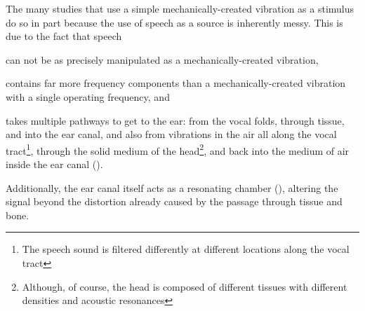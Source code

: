 The many studies that use a simple mechanically-created vibration as a stimulus do so in part because the use of speech as a source is inherently messy.  This is due to the fact that speech 
\begin{enumerate*}[label={\alph*)}]
  \item  can not be as precisely manipulated as a mechanically-created vibration,
  \item  contains far more frequency components than a mechanically-created vibration with a single operating frequency, and 
  \item  takes multiple pathways to get to the ear: from the vocal folds, through tissue, and into the ear canal, and also from vibrations in the air all along the vocal tract\footnote{The speech sound is filtered differently at different locations along the vocal tract}, through the solid medium of the head\footnote{Although, of course, the head is composed of different tissues with different densities and acoustic resonances}, and back into the medium of air inside the ear canal (\cite{bekesy:60}).
\end{enumerate*}
% 
%
Additionally, the ear canal itself acts as a resonating chamber (\cite{rosen:91}), altering the signal beyond the distortion already caused by the passage through tissue and bone.  


